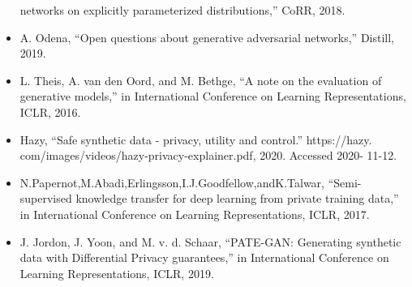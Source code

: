 \documentclass[11pt]{article}
\begin{document}
\begin{itemize}
        networks on explicitly parameterized distributions,” CoRR, 2018.
        \item A. Odena, “Open questions about generative adversarial networks,”
        Distill, 2019.
        \item L. Theis, A. van den Oord, and M. Bethge, “A note on the evaluation
        of generative models,” in International Conference on Learning Representations, ICLR, 2016.
        \item Hazy, “Safe synthetic data - privacy, utility and control.” https://hazy.
        com/images/videos/hazy-privacy-explainer.pdf, 2020. Accessed 2020-
        11-12.
        \item N.Papernot,M.Abadi,Erlingsson,I.J.Goodfellow,andK.Talwar, “Semi-supervised knowledge transfer for deep learning from private training data,” in International Conference on Learning Representations, ICLR, 2017.
        \item J. Jordon, J. Yoon, and M. v. d. Schaar, “PATE-GAN: Generating synthetic data with Differential Privacy guarantees,” in International Conference on Learning Representations, ICLR, 2019.
    \end{itemize}
\end{document}

